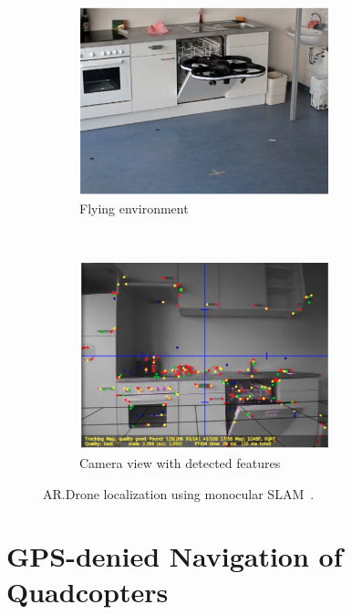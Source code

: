 	\begin{figure}[ht]
            \centering
            \begin{subfigure}[b]{0.5\textwidth}
                    \centering
                    \includegraphics[width=0.8\textwidth]{../images/Engel2.png}
                    \caption{Flying environment}
            \end{subfigure}%
            ~ %
            \begin{subfigure}[b]{0.5\textwidth}
                    \centering
                    \includegraphics[width=0.8\textwidth]{../images/Engel1.png}
                    \caption{Camera view with detected features}
            \end{subfigure}
            \caption{AR.Drone localization using monocular SLAM~\cite{Engel2}.}
    \end{figure}


\section{GPS-denied Navigation of Quadcopters}

